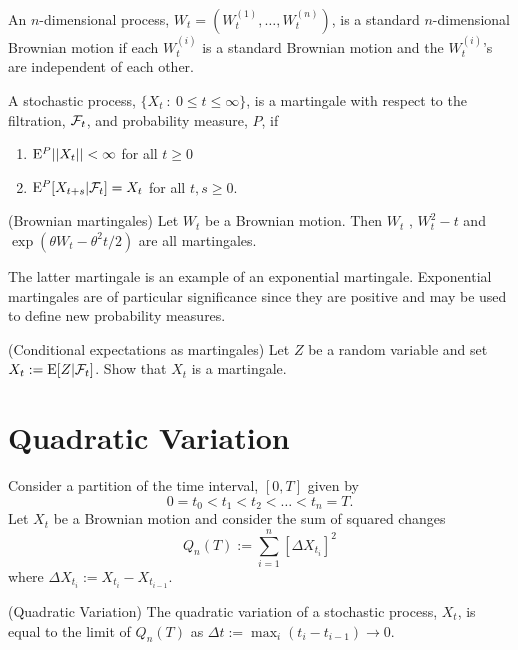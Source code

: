 \begin{definition}
An $n$-dimensional process, $W_{t}=(W^{(1)}_{t},\ldots,W^{(n)}_{t})$, is a standard $n$-dimensional Brownian motion if each $W^{(i)}_{t}$ is a standard Brownian motion and the $W^{(i)}_{t}$'s are independent of each other.
\end{definition}

\begin{definition}
A stochastic process, $\{X_{t}\ :\ 0\leq t\leq\infty\}$, is a martingale with respect to the filtration, ${\cal F}_{t}$, and probability measure, $P$, if
\begin{enumerate}
    \item ${\rm E}^{P}||X_{t}||<\infty$ for all $t\geq 0$
    \item ${\rm E}^{P}[X_{t+s}|{\cal F}_{t}]=X_{t}$ for all $t,s\geq 0$.
\end{enumerate}
\end{definition}

\begin{example} (Brownian martingales)
Let $W_{t}$ be a Brownian motion. Then $W_{t}$ , $W^{2}_{t}-t$ and $\exp\left(\theta W_{t}-\theta^{2}t/2\right)$ are all martingales.

The latter martingale is an example of an exponential martingale. Exponential martingales are of particular significance since they are positive and may be used to define new probability measures.
\end{example}

\begin{example} (Conditional expectations as martingales) 
Let $Z$ be a random variable and set $X_{t}:={\rm E}[Z|{\cal F}_{t}]$. Show that $X_{t}$ is a martingale.
\end{example}

\section{Quadratic Variation}
Consider a partition of the time interval, $[0,T]$ given by
\[0=t_{0}<t_{1}<t_{2}<\ldots<t_{n}=T.\]
Let $X_{t}$ be a Brownian motion and consider the sum of squared changes
\[Q_{n}(T):=\sum_{i=1}^{n}[\Delta X_{t_{i}}]^{2}\]
where $\Delta X_{t_{i}}:=X_{t_{i}}-X_{t_{i-1}}$.

\begin{definition} (Quadratic Variation)
The quadratic variation of a stochastic process, $X_{t}$, is equal to the limit of $Q_{n}(T)$ as $\Delta t:=\max_{i}(t_{i}-t_{i-1})\to 0$.
\end{definition}

